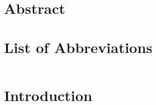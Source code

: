 \documentclass[12pt,a4paper]{report}
\begin{document}
\chapter*{Abstract}

\tableofcontents
\newpage

\listoffigures
\newpage

\listoftables
\newpage

\chapter*{List of Abbreviations}
\begin{tabular}{ll}
\end{tabular}
\newpage

\setcounter{page}{1}

\chapter{Introduction}
\label{chap:introduction}
\end{document}
